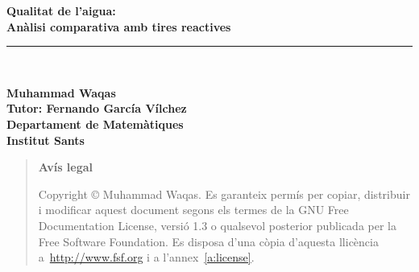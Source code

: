 \newlength{\centeroffset}
\setlength{\centeroffset}{-0.5\oddsidemargin}
\addtolength{\centeroffset}{0.5\evensidemargin}
\thispagestyle{empty}
\noindent\hspace*{\centeroffset}\begin{minipage}{\textwidth}
\vspace*{3truecm}

\flushright
{\Huge\bfseries 
  Qualitat de l’aigua:\\
}
\vspace*{0.5truecm}
{\LARGE\bfseries
  Anàlisi comparativa amb tires reactives
}
\noindent\rule[-1ex]{\textwidth}{5pt}\\[4.5ex]
\end{minipage}

\noindent\hspace*{\centeroffset}\begin{minipage}{\textwidth}
\flushright
{\bfseries 
	Muhammad Waqas\\
	Tutor: Fernando García Vílchez \\
	Departament de Matemàtiques\\
	Institut Sants\\
}
\end{minipage}


\pagebreak

\vspace*{16truecm}

	\begin{quote}
	\textbf{Avís legal}

	  Copyright \copyright{}  Muhammad Waqas.
	  Es garanteix permís per copiar, distribuir i modificar aquest document segons els termes de la GNU Free Documentation License, versió 1.3 o qualsevol posterior publicada per la Free Software Foundation. Es disposa d'una còpia d'aquesta llicència a~\href{http://www.fsf.org}{http://www.fsf.org} i a l'annex~\ref{a:license}.
	\end{quote}	





\endinput
